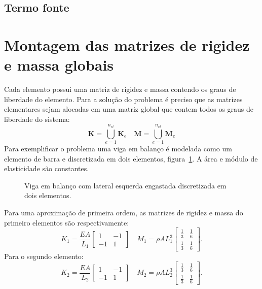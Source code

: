 \subsection{Termo fonte}



\section{Montagem das matrizes de rigidez e massa globais}

\indent Cada elemento possui uma matriz de rigidez e massa contendo os graus de liberdade do elemento. Para a solução do problema é preciso que as matrizes elementares sejam alocadas em uma matriz global que contem todos os graus de liberdade do sistema:
\begin{equation}
    \mathbf{K} = \bigcup_{e=1}^{n_{el}} \mathbf{K}_e  \quad \mathbf{M} = \bigcup_{e=1}^{n_{el}} \mathbf{M}_e 
\end{equation}
\indent Para exemplificar o problema uma viga em balanço é modelada como um elemento de barra e discretizada em dois elementos, figura~\ref{fig:C.1}. A área e módulo de elasticidade são constantes.
\begin{figure}[H]
    \centering
    \caption{Viga em balanço com lateral esquerda engastada discretizada em dois elementos.}
    \label{fig:C.1}
    \resizebox{0.6\textwidth}{!}{}
\end{figure}
\indent Para uma aproximação de primeira ordem, as matrizes de rigidez e massa do primeiro elementos são respectivamente:
\begin{equation}
    K_1 = \frac{EA}{L_1} \begin{bmatrix} 1 & -1 \\ -1 & 1 \end{bmatrix} \quad M_1 = \rho A L_1^3 \begin{bmatrix} \frac{1}{3} & \frac{1}{6} \\ \frac{1}{3} & \frac{1}{6} \end{bmatrix}.
\end{equation}
Para o segundo elemento:
\begin{equation}
    K_2 = \frac{EA}{L_2} \begin{bmatrix} 1 & -1 \\ -1 & 1 \end{bmatrix} \quad M_2 = \rho A L_2^3 \begin{bmatrix} \frac{1}{3} & \frac{1}{6} \\ \frac{1}{3} & \frac{1}{6} \end{bmatrix}.
\end{equation}

